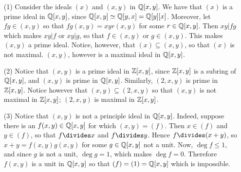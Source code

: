 \begin{example}\label{label_7.3}
\begin{enumerate}
\item[(1)] Consider the ideals $(x)$ and $(x,y)$ in $\mathbb{Q}[x,y]$. We have
that $(x)$ is a prime ideal in $\mathbb{Q}[x,y]$, since $\mathbb{Q}[x,y] \simeq
\mathbb{Q}[y,x]=\mathbb{Q}[y][x]$. Moreover, let $fg \in (x,y)$ so that
$fg(x,y)=xyr(x,y)$ for some $r \in \mathbb{Q}[x,y]$. Then $xy|fg$ which
makes  $xy|f$ or  $xy|g$, so that $f \in (x,y)$ or $g \in (x,y)$.
This makes $(x,y)$ a prime ideal. Notice, however, that $(x)
\subseteq (x,y)$, so that $(x)$ is not maximal. $(x,y)$, however is
a maximal ideal in $\mathbb{Q}[x,y]$.

\item[(2)] Notice that $(x,y)$ is a prime ideal in $\mathbb{Z}[x,y]$, since
$\mathbb{Z}[x,y]$ is a subring of $\mathbb{Q}[x,y]$, and $(x,y)$ is prime in
$\mathbb{Q}[x,y]$. Similarly, $(2,x,y)$ is prime in $\mathbb{Z}[x,y]$. Notice
however that $(x,y) \subseteq (2,x,y)$ so that $(x,y)$ is not
maximal in $\mathbb{Z}[x,y]$; $(2,x,y)$ is maximal in $\mathbb{Z}[x,y]$.

\item[(3)] Notice that $(x,y)$ is not a principle ideal in $\mathbb{Q}[x,y]$.
  Indeed, suppose there is an $f(x,y) \in \mathbb{Q}[x,y]$ for which
  $(x,y)=(f)$. Then $x \in (f)$ and $y \in (f)$, so that $f \divides
  x$ and  $f \divides y$. Hence $f \divides (x+y)$, so
  $x+y=f(x,y)g(x,y)$ for some $g \in \mathbb{Q}[x,y]$ not a unit. Now,
  $\deg{f} \leq 1$, and since $g$ is not a unit, $\deg{g}=1$, which
  makes $\deg{f}=0$. Therefore $f(x,y)$ is a unit in $\mathbb{Q}[x,y]$ so that
  $(f)=(1)=\mathbb{Q}[x,y]$ which is impossible.
\end{enumerate}
\end{example}

